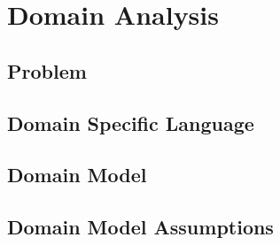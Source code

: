 \chapter{Domain Analysis}

\section{Problem}

\section{Domain Specific Language}

\section{Domain Model}

\section{Domain Model Assumptions}
